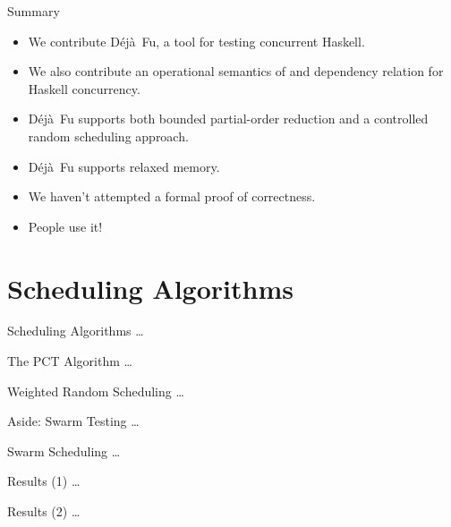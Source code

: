 \documentclass{beamer}
\newcommand{\dejafu}{D\'{e}j\`{a}~Fu}
\begin{document}
\begin{frame}{Summary}
  \begin{itemize}
  \item We contribute \dejafu{}, a tool for testing concurrent
    Haskell.

  \item We also contribute an operational semantics of and dependency
    relation for Haskell concurrency.

  \item \dejafu{} supports both bounded partial-order reduction and a
    controlled random scheduling approach.

  \item \dejafu{} supports relaxed memory.

  \item We haven't attempted a formal proof of correctness.

  \item People use it!
  \end{itemize}
\end{frame}

\section{Scheduling Algorithms}

\begin{frame}{Scheduling Algorithms}
  \ldots
\end{frame}

\begin{frame}{The PCT Algorithm}
  \ldots
\end{frame}

\begin{frame}{Weighted Random Scheduling}
  \ldots
\end{frame}

\begin{frame}{Aside: Swarm Testing}
  \ldots
\end{frame}

\begin{frame}{Swarm Scheduling}
  \ldots
\end{frame}

\begin{frame}{Results (1)}
  \ldots %
\end{frame}

\begin{frame}{Results (2)}
  \ldots %
\end{frame}
\end{document}
